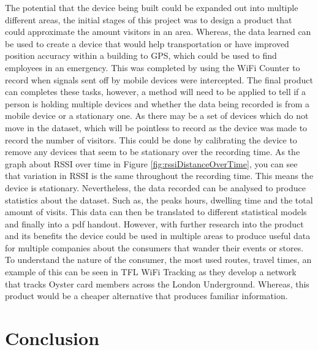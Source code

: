 \documentclass{report}
\begin{document}
The potential that the device being built could be expanded out into multiple different areas, the initial stages of this project was to design a product that could approximate the amount visitors in an area. Whereas, the data learned can be used to create a device that would help transportation or have improved position accuracy within a building to GPS, which could be used to find employees in an emergency.  This was completed by using the WiFi Counter to record when signals sent off by mobile devices were intercepted. The final product can completes these tasks, however, a method will need to be applied to tell if a person is holding multiple devices and whether the data being recorded is from a mobile device or a stationary one. As there may be a set of devices which do not move in the dataset, which will be pointless to record as the device was made to record the number of visitors. This could be done by calibrating the device to remove any devices that seem to be stationary over the recording time. As the graph about RSSI over time in Figure \ref{fig:rssiDistanceOverTime}, you can see that variation in RSSI is the same throughout the recording time. This means the device is stationary. Nevertheless, the data recorded can be analysed to produce statistics about the dataset. Such as, the peaks hours, dwelling time and the total amount of visits. This data can then be translated to different statistical models and finally into a pdf handout. However, with further research into the product and its benefits the device could be used in multiple areas to produce useful data for multiple companies about the consumers that wander their events or stores. To understand the nature of the consumer, the most used routes, travel times, an example of this can be seen in TFL WiFi Tracking\cite{GizmodoLondon} as they develop a network that tracks Oyster card members across the London Underground. Whereas, this product would be a cheaper alternative that produces familiar information.
\chapter{Conclusion}
\end{document}
